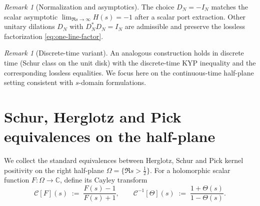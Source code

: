 \documentclass[11pt]{article}
\theoremstyle{remark}
\newtheorem{remark}[theorem]{Remark}
\newcommand{\C}{\mathbb{C}}
\begin{document}
\begin{remark}[Normalization and asymptotics]
The choice \(D_N=-I_N\) matches the scalar asymptotic \(\lim_{\Re s\to\infty} H(s)=-1\) after a scalar port extraction. Other unitary dilations \(D_N\) with \(D_N^*D_N=I_N\) are admissible and preserve the lossless factorization \eqref{eq:one-line-factor}.
\end{remark}

\begin{remark}[Discrete-time variant]
An analogous construction holds in discrete time (Schur class on the unit disk) with the discrete-time KYP inequality and the corresponding lossless equalities. We focus here on the continuous-time half-plane setting consistent with \(s\)-domain formulations.
\end{remark}

\section{Schur, Herglotz and Pick equivalences on the half-plane}\label{sec:equivalences}
We collect the standard equivalences between Herglotz, Schur and Pick kernel positivity on the right half-plane \(\Omega=\{\Re s>\tfrac12\}\). For a holomorphic scalar function \(F:\Omega\to\C\), define its Cayley transform
\[
 \mathcal C[F](s)\;:=\;\frac{F(s)-1}{F(s)+1},\qquad \mathcal C^{-1}[\Theta](s)\;:=\;\frac{1+\Theta(s)}{1-\Theta(s)}.
\]
\end{document}
